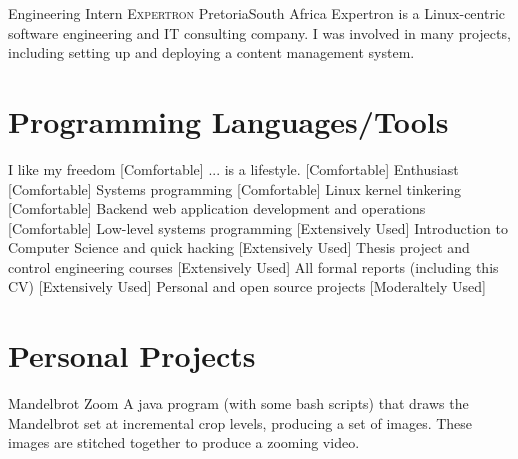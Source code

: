 \documentclass[11pt,a4paper,sans]{moderncv}
\begin{document}
{Engineering Intern}
{\textsc{Expertron}}
{\newline Pretoria}{South Africa}
{Expertron is a Linux-centric software engineering and IT consulting company. I
was involved in many projects, including setting up and deploying a content
management system.}


\section{Programming Languages/Tools}

{{\normalfont I like my freedom}}
{[Comfortable]}
{{\normalfont ... is a lifestyle.}}
{[Comfortable]}
{{\normalfont Enthusiast}}
{[Comfortable]}
{{\normalfont Systems programming}}
{[Comfortable]}
{{\normalfont Linux kernel tinkering}}
{[Comfortable]}
{{\normalfont Backend web application development and operations}}
{[Comfortable]}
{{\normalfont Low-level systems programming}}
{[Extensively Used]}
{{\normalfont Introduction to Computer Science and quick hacking}}
{[Extensively Used]}
{{\normalfont Thesis project and control engineering courses}}
{[Extensively Used]}
{{\normalfont All formal reports (including this CV)}}
{[Extensively Used]}
{{\normalfont Personal and open source projects}}
{[Moderaltely Used]}


\section{Personal Projects}

{Mandelbrot Zoom}
{}
{}{}
{A java program (with some bash scripts) that draws the Mandelbrot set at
incremental crop levels, producing a set of images. These images are stitched
together to produce a zooming video.}
\end{document}
